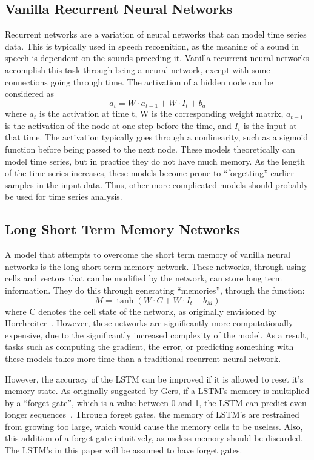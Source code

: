 \documentclass{article}
\begin{document}
\subsection{Vanilla Recurrent Neural Networks}
Recurrent networks are a variation of neural networks that can model time series
data. This is typically used in speech recognition, as the meaning of a sound in
speech is dependent on the sounds preceding it. Vanilla recurrent neural
networks accomplish this task through being a neural network, except with some
connections going through time.  The activation of a hidden node can be
considered as 
$$a_t = W\cdot a_{t-1} + W\cdot I_t + b_a$$
where $a_t$ is the activation at time t, W is the corresponding weight matrix,
$a_{t-1}$ is the activation of the node at one step before the time, and $I_t$
is the input at that time. The activation typically goes through a nonlinearity,
such as a sigmoid function before being passed to the next node. These models
theoretically can model time series, but in practice they do not have much
memory. As the length of the time series increases, these models become prone to
``forgetting'' earlier samples in the input data. Thus, other more complicated
models should probably be used for time series analysis.

\subsection{Long Short Term Memory Networks}
A model that attempts to overcome the short term memory of vanilla neural
networks is the long short term memory network. These networks, through using
cells and vectors that can be modified by the network, can store long term
information. They do this through generating ``memories'', through the function:
$$M = \tanh(W\cdot C + W\cdot I_t + b_M)$$ where C denotes the cell state of the
network, as originally envisioned by Horchreiter~\cite{lstm}. However, these
networks are significantly more computationally expensive, due to the
significantly increased complexity of the model. As a result, tasks such as
computing the gradient, the error, or predicting something with these models
takes more time than a traditional recurrent neural network.

However, the accuracy of the LSTM can be improved if it is allowed to reset
it's memory state. As originally suggested by Gers, if a LSTM's memory is
multiplied by a ``forget gate'', which is a value between 0 and 1, the LSTM can
predict even longer sequences~\cite{forgetgate}. Through forget gates, the memory of
LSTM's are restrained from growing too large, which would cause the memory cells
to be useless. Also, this addition of a forget gate intuitively, as useless
memory should be discarded. The LSTM's in this paper will be assumed to have
forget gates.
\end{document}
